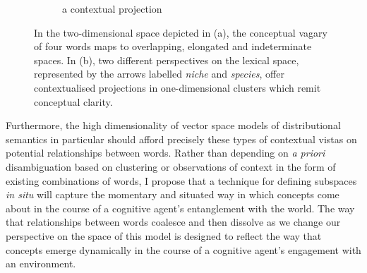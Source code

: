 {\begin{figure}[t]
\begin{subfigure}[t]{0.5\textwidth}
    \caption{a contextual projection}
    \label{fig:perspective}
    \end{subfigure}
  \caption{In the two-dimensional space depicted in (a), the conceptual vagary of four words maps to overlapping, elongated and indeterminate spaces.  In (b), two different perspectives on the lexical space, represented by the arrows labelled \emph{niche} and \emph{species}, offer contextualised projections in one-dimensional clusters which remit conceptual clarity.}
\end{figure}

Furthermore, the high dimensionality of vector space models of distributional semantics in particular should afford precisely these types of contextual vistas on potential relationships between words.  Rather than depending on \emph{a priori} disambiguation based on clustering or observations of context in the form of existing combinations of words, I propose that a technique for defining subspaces \emph{in situ} will capture the momentary and situated way in which concepts come about in the course of a cognitive agent's entanglement with the world.  The way that relationships between words coalesce and then dissolve as we change our perspective on the space of this model is designed to reflect the way that concepts emerge dynamically in the course of a cognitive agent's engagement with an environment.

}

